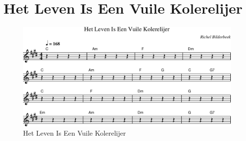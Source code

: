 \chapter{Het Leven Is Een Vuile Kolerelijer}



\begin{figure}[!htbp]
  \includegraphics[width=\textwidth,height=\textheight,keepaspectratio]{../songs/19_het_leven_is_een_vuile_kolerelijer.png}
  \caption{Het Leven Is Een Vuile Kolerelijer}
  \label{fig:19_het_leven_is_een_vuile_kolerelijer}
\end{figure}
